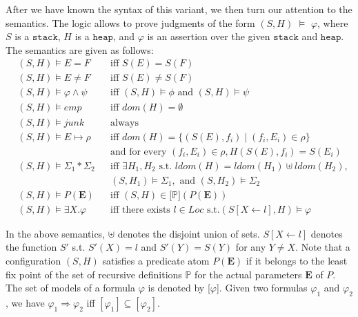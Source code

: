 \documentclass{article}
\theoremstyle{plain}
\begin{document}
After we have known the syntax of this variant, we then turn our attention to the semantics. The logic allows to prove judgments of the form $(S,H)$ $\vDash$ $\varphi$, where $S$ is a $\mathtt{stack}$, $H$ is a $\mathtt{heap}$, and $\varphi$ is an assertion over the given $\mathtt{stack}$ and $\mathtt{heap}$. The semantics are given as follows:
\begin{align*}
   & (S,H) \models E = F  & &\text{iff } S(E) = S(F)\\
   & (S,H) \models E \neq F & &\text{iff }  S(E) \neq S(F)\\
   & (S,H) \models \varphi \wedge \psi & &\text{iff } (S,H) \models \phi \text{ and } (S,H) \models \psi\\
    &(S,H) \models emp & &\text{iff } dom(H) = \emptyset\\
    &(S,H) \models junk  \quad  & &\text{always}\\
    &(S,H) \models E \mapsto \rho & &\text{iff } dom(H) = \{(S(E),f_i) \mid (f_i,E_i) \in \rho\} \\ & & &\text{and for every } (f_i,E_i) \in \rho , H(S(E),f_i) = S(E_i) \\
    &(S,H) \models \Sigma_1 \ast \Sigma_2 & &\text{iff }  \exists H_1 , H_2 \text{ s.t. } ldom(H)=ldom(H_1) \uplus ldom(H_2),\\ & & &(S,H_1) \models \Sigma_1, \text{ and } (S,H_2) \models \Sigma_2\\
    &(S,H) \models P(\mathbf{E}) & &\text{iff } (S,H) \in  \mathbb{[}\mathbb{P]}(P(\mathbf{E}))\\
    &(S,H) \models \exists X.\varphi & &\text{iff } \text{there exists }  \mathit{l} \in Loc \text{ s.t.}  (S[X \gets \mathit{l}], H) \models \varphi
\end{align*}

In the above semantics, $\uplus$ denotes the disjoint union of sets. $ S[X\gets\mathit{l}]$ denotes the function $S'$ s.t. $S'(X) = l$ and $S'(Y)=S(Y)$ for any $Y \ne X$. Note that a configuration $(S,H)$ satisfies a predicate atom $P(\mathbf{E})$ if it belongs to the least fix point of the set of recursive definitions $\mathbb{P}$ for the actual parameters $\mathbf{E}$ of $P$. The set of models of a formula $\varphi$ is denoted by [$\varphi$]. Given two formulas $\varphi_1$ and $\varphi_2$, we have $\varphi_1 \Rightarrow \varphi_2$ iff $[\varphi_1] \subseteq [\varphi_2]$.
\end{document}
